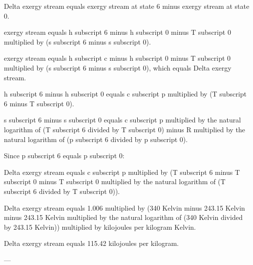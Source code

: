 Delta exergy stream equals exergy stream at state 6 minus exergy stream at state 0.  

exergy stream equals h subscript 6 minus h subscript 0 minus T subscript 0 multiplied by (s subscript 6 minus s subscript 0).  

exergy stream equals h subscript c minus h subscript 0 minus T subscript 0 multiplied by (s subscript 6 minus s subscript 0), which equals Delta exergy stream.  

h subscript 6 minus h subscript 0 equals c subscript p multiplied by (T subscript 6 minus T subscript 0).  

s subscript 6 minus s subscript 0 equals c subscript p multiplied by the natural logarithm of (T subscript 6 divided by T subscript 0) minus R multiplied by the natural logarithm of (p subscript 6 divided by p subscript 0).  

Since p subscript 6 equals p subscript 0:  

Delta exergy stream equals c subscript p multiplied by (T subscript 6 minus T subscript 0 minus T subscript 0 multiplied by the natural logarithm of (T subscript 6 divided by T subscript 0)).  

Delta exergy stream equals 1.006 multiplied by (340 Kelvin minus 243.15 Kelvin minus 243.15 Kelvin multiplied by the natural logarithm of (340 Kelvin divided by 243.15 Kelvin)) multiplied by kilojoules per kilogram Kelvin.  

Delta exergy stream equals 115.42 kilojoules per kilogram.  

---